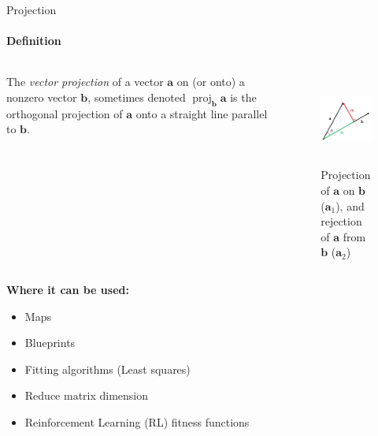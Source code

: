 \documentclass[aspectratio=169,notes]{beamer}
\begin{document}
\begin{frame}[t]{Projection}
    \framesubtitle{Definition}
    \vspace{-0.3cm}
    \begin{columns}[T,onlytextwidth]
        \begin{column}{0.5\textwidth}
            The \textit{vector projection} of a vector $\mathbf {a}$ on (or onto) a nonzero vector $\mathbf {b}$, sometimes denoted $\operatorname {proj} _{\mathbf {b} }\mathbf {a}$  is the orthogonal projection of $\mathbf {a}$ onto a straight line parallel to $\mathbf {b}$.
        \end{column}
        \begin{column}{0.49\textwidth}
            \vspace{-1cm}
            \begin{figure}[H]
                \centering\includegraphics[height=3cm,width=1\textwidth,keepaspectratio]{Projection_and_rejection.png}
                \caption*{Projection of $\mathbf{a}$ on $\mathbf{b}$ ($\mathbf{a}_1$), and rejection of $\mathbf{a}$ from $\mathbf{b}$ ($\mathbf{a}_2$)}
                \label{fig:Projection_and_rejection.png}
            \end{figure}
        \end{column}
    \end{columns}
    \textbf{Where it can be used:}
    \vspace{-0.5cm}
    \begin{multicols}{2}
        \begin{itemize}
            \item Maps
            \item Blueprints
            \item Fitting algorithms (Least squares)
            \item Reduce matrix dimension
            \item Reinforcement Learning (RL) fitness functions
        \end{itemize}
    \end{multicols}
\end{frame}
\end{document}
